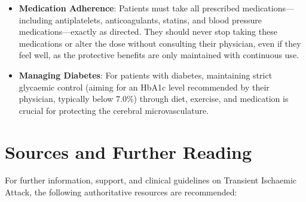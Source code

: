 \begin{itemize}
    \item \textbf{Medication Adherence}: Patients must take all prescribed medications---including antiplatelets, anticoagulants, statins, and blood pressure medications---exactly as directed. They should never stop taking these medications or alter the dose without consulting their physician, even if they feel well, as the protective benefits are only maintained with continuous use.

    \item \textbf{Managing Diabetes}: For patients with diabetes, maintaining strict glycaemic control (aiming for an HbA1c level recommended by their physician, typically below 7.0\%) through diet, exercise, and medication is crucial for protecting the cerebral microvasculature.
\end{itemize}

\section*{Sources and Further Reading}
For further information, support, and clinical guidelines on Transient Ischaemic Attack, the following authoritative resources are recommended:

